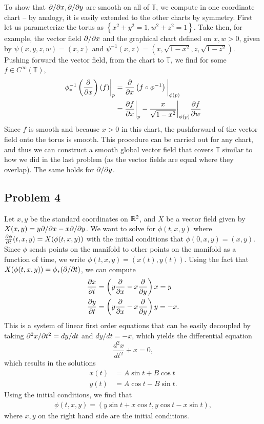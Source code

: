 \documentclass{../../mathnotes}
\begin{document}
To show that $\partial/\partial x,\partial/\partial y$ are smooth on all of $\mathbb{T}$, we compute in one coordinate chart -- by analogy,
it is easily extended to the other charts by symmetry. First let us parameterize the torus as $\left\{ x^2+y^2=1,w^2+z^2=1 \right\}$.
Take then, for example, the vector field $\partial/\partial x$ and the graphical chart defined on $x,w>0$, given by
$\psi(x,y,z,w)=(x,z)$ and $\psi^{-1}(x,z)=(x,\sqrt{1-x^2},z,\sqrt{1-z^2})$.
Pushing forward the vector field, from the chart to $\mathbb{T}$, we find for some $f\in C^\infty(\mathbb{T})$,
\begin{align*}
    \phi^{-1}_*\left( \frac{\partial}{\partial x} \right)(f)\bigg|_p&=\frac{\partial}{\partial x}\left( f\circ\phi^{-1} \right)\bigg|_{\phi(p)}\\
    &=\frac{\partial f}{\partial x}\bigg|_p-\frac{x}{\sqrt{1-x^2}}\bigg|_{\phi(p)}\frac{\partial f}{\partial w}
\end{align*}
Since $f$ is smooth and because $x>0$ in this chart, the pushforward of the vector field onto the torus is smooth.
This procedure can be carried out for any chart, and thus we can construct a smooth global vector field that covers
$\mathbb{T}$ similar to how we did in the last problem (as the vector fields are equal where they overlap). The same
holds for $\partial/\partial y$.

\subsection*{Problem 4}

Let $x,y$ be the standard coordinates on $\mathbb{R}^2$, and $X$ be a vector field given by $X(x,y)=y\partial/\partial x-x\partial/\partial y$.
We want to solve for $\phi(t,x,y)$ where $\frac{\partial\phi}{\partial t}(t,x,y)=X(\phi(t,x,y))$ with the initial
conditions that $\phi(0,x,y)=(x,y)$. Since $\phi$ sends points on the manifold to other points on the manifold
as a function of time, we write $\phi(t,x,y)=(x(t),y(t))$. Using the fact that $X(\phi(t,x,y))=\phi_*(\partial/\partial t)$,
we can compute
\begin{align*}
    \frac{\partial x}{\partial t}&=\left( y\frac{\partial}{\partial x}-x\frac{\partial}{\partial y} \right)x=y\\
    \frac{\partial y}{\partial t}&=\left( y\frac{\partial}{\partial x}-x\frac{\partial}{\partial y} \right)y=-x.
\end{align*}
This is a system of linear first order equations that can be easily decoupled by taking
$\partial^2x/\partial t^2=dy/dt$ and $dy/dt=-x$, which yields the differential equation
\[\frac{d^2x}{dt^2}+x=0,\]
which results in the solutions
\begin{align*}
    x(t)&=A\sin t+B\cos t\\
    y(t)&=A\cos t-B\sin t.
\end{align*}
Using the initial conditions, we find that
\begin{align*}
    \phi(t,x,y)=\left( y\sin t+x\cos t,y\cos t-x\sin t \right),
\end{align*}
where $x,y$ on the right hand side are the initial conditions.
\end{document}
